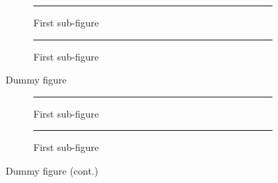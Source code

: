 \documentclass[11pt]{article}
\begin{document}
  \listoffigures

  \begin{figure}[!p]
    \centering
    \begin{subfigure}[b]{0.75\linewidth}
      \rule{\linewidth}{0.75\linewidth}
      \caption{First sub-figure}
      \label{subfig-1:dummy}
    \end{subfigure}

    \medskip
    \begin{subfigure}[b]{0.75\linewidth}
      \rule{\linewidth}{0.75\linewidth}
      \caption{First sub-figure}
      \label{subfig-2:dummy}
    \end{subfigure}
    \caption{Dummy figure}
    \label{fig:dummy}
  \end{figure}

  \begin{figure}[!p]
    \ContinuedFloat
    \captionsetup{list=no}
    \centering
    \begin{subfigure}[b]{0.75\linewidth}
      \rule{\linewidth}{0.75\linewidth}
      \caption{First sub-figure}
      \label{subfig-3:dummy}
    \end{subfigure}

    \medskip
    \begin{subfigure}[b]{0.75\linewidth}
      \rule{\linewidth}{0.75\linewidth}
      \caption{First sub-figure}
      \label{subfig-4:dummy}
    \end{subfigure}
    \caption{Dummy figure (cont.)}
    \label{fig:dummy-cont}
  \end{figure}
\end{document}
